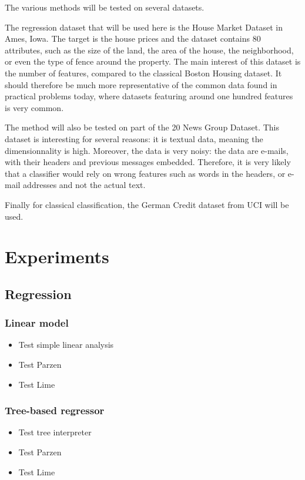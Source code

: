 \documentclass[a4paper,11pt]{kth-mag}
\begin{document}
The various methods will be tested on several datasets.

The regression dataset that will be used here is the House Market Dataset in Ames, Iowa. The target is the house prices and the dataset contains 80 attributes, such as the size of the land, the area of the house, the neighborhood, or even the type of fence around the property. The main interest of this dataset is the number of features, compared to the classical Boston Housing dataset. It should therefore be much more representative of the common data found in practical problems today, where datasets featuring around one hundred features is very common.

The method will also be tested on part of the 20 News Group Dataset. This dataset is interesting for several reasons: it is textual data, meaning the dimensionnality is high. Moreover, the data is very noisy: the data are e-mails, with their headers and previous messages embedded. Therefore, it is very likely that a classifier would rely on wrong features such as words in the headers, or e-mail addresses and not the actual text.

Finally for classical classification, the German Credit dataset from UCI will be used.


\chapter{Experiments}

\section{Regression}

\subsection{Linear model}

\begin{itemize}
	\item Test simple linear analysis
	\item Test Parzen
	\item Test Lime
\end{itemize}

\subsection{Tree-based regressor}

\begin{itemize}
	\item Test tree interpreter
	\item Test Parzen
	\item Test Lime
\end{itemize}
\end{document}

